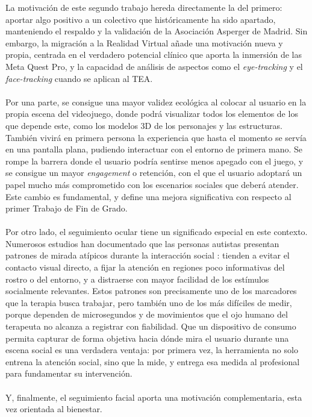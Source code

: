 \documentclass[12pt,twoside,titlepage]{report}
\begin{document}
La motivación de este segundo trabajo hereda directamente la del primero: aportar algo positivo a un colectivo que históricamente ha sido apartado, manteniendo el respaldo y la validación de la Asociación Asperger de Madrid.
Sin embargo, la migración a la Realidad Virtual añade una motivación nueva y propia, centrada en el verdadero potencial clínico que aporta la inmersión de las Meta Quest Pro, y la capacidad de análisis de aspectos como el \textit{eye-tracking} y el \textit{face-tracking} cuando se aplican al TEA.\\
\\
Por una parte, se consigue una mayor validez ecológica al colocar al usuario en la propia escena del videojuego, donde podrá visualizar todos los elementos de los que depende este, como los modelos 3D de los personajes y las estructuras.
También vivirá en primera persona la experiencia que hasta el momento se servía en una pantalla plana, pudiendo interactuar con el entorno de primera mano.
Se rompe la barrera donde el usuario podría sentirse menos apegado con el juego, y se consigue un mayor \textit{engagement} o retención, con el que el usuario adoptará un papel mucho más comprometido con los escenarios sociales que deberá atender.
Este cambio es fundamental, y define una mejora significativa con respecto al primer Trabajo de Fin de Grado.\\
\\
Por otro lado, el seguimiento ocular tiene un significado especial en este contexto.
Numerosos estudios han documentado que las personas autistas presentan patrones de mirada atípicos durante la interacción social \parencite{klin2002}: tienden a evitar el contacto visual directo, a fijar la atención en regiones poco informativas del rostro o del entorno, y a distraerse con mayor facilidad de los estímulos socialmente relevantes.
Estos patrones son precisamente uno de los marcadores que la terapia busca trabajar, pero también uno de los más difíciles de medir, porque dependen de microsegundos y de movimientos que el ojo humano del terapeuta no alcanza a registrar con fiabilidad.
Que un dispositivo de consumo permita capturar de forma objetiva hacia dónde mira el usuario durante una escena social es una verdadera ventaja: por primera vez, la herramienta no solo entrena la atención social, sino que la mide, y entrega esa medida al profesional para fundamentar su intervención.\\
\\
Y, finalmente, el seguimiento facial aporta una motivación complementaria, esta vez orientada al bienestar.
\end{document}
